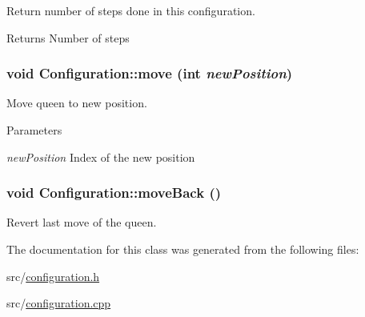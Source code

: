 Return number of steps done in this configuration. 

\begin{DoxyReturn}{Returns}
Number of steps 
\end{DoxyReturn}
\hypertarget{class_configuration_a376c3c8652d090d37e833edbd8062401}{
\subsubsection[{move}]{\setlength{\rightskip}{0pt plus 5cm}void Configuration::move (int {\em newPosition})}}
\label{class_configuration_a376c3c8652d090d37e833edbd8062401}


Move queen to new position. 


\begin{DoxyParams}{Parameters}
\item[{\em newPosition}]Index of the new position \end{DoxyParams}
\hypertarget{class_configuration_a0ea8b5ce3341e601c8dcc8af0d0b066f}{
\subsubsection[{moveBack}]{\setlength{\rightskip}{0pt plus 5cm}void Configuration::moveBack ()}}
\label{class_configuration_a0ea8b5ce3341e601c8dcc8af0d0b066f}


Revert last move of the queen. 



The documentation for this class was generated from the following files:\begin{DoxyCompactItemize}
\item 
src/\hyperlink{configuration_8h}{configuration.h}\item 
src/\hyperlink{configuration_8cpp}{configuration.cpp}\end{DoxyCompactItemize}
